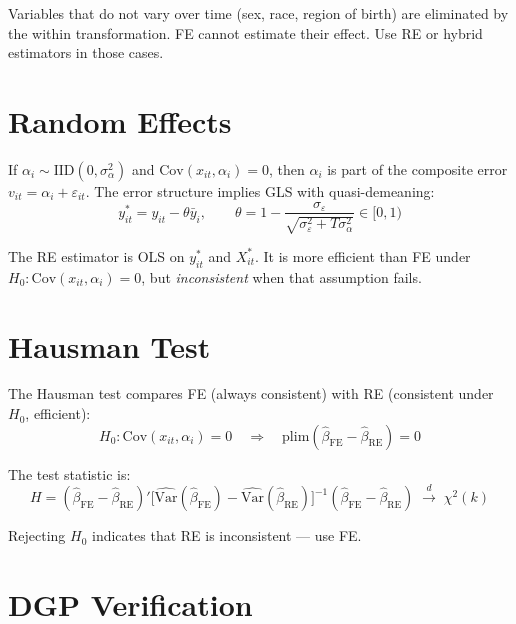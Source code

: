 \begin{aviso}
  Variables that do not vary over time (sex, race, region of birth) are
  eliminated by the within transformation. FE cannot estimate their effect.
  Use RE or hybrid estimators in those cases.
\end{aviso}

\section{Random Effects}

If $\alpha_i \sim \mathrm{IID}(0, \sigma^2_\alpha)$ and
$\mathrm{Cov}(x_{it}, \alpha_i) = 0$, then $\alpha_i$ is part of the composite error
$v_{it} = \alpha_i + \varepsilon_{it}$. The error structure implies GLS with
quasi-demeaning:
\[
  y^*_{it} = y_{it} - \theta\bar{y}_i,
  \qquad
  \theta = 1 - \frac{\sigma_\varepsilon}{\sqrt{\sigma^2_\varepsilon + T\sigma^2_\alpha}}
  \in [0,1)
\]

The RE estimator is OLS on $y^*_{it}$ and $X^*_{it}$. It is more efficient than
FE under $H_0: \mathrm{Cov}(x_{it},\alpha_i) = 0$, but \emph{inconsistent}
when that assumption fails.

\section{Hausman Test}

The Hausman test compares FE (always consistent) with RE (consistent under
$H_0$, efficient):
\[
  H_0: \mathrm{Cov}(x_{it}, \alpha_i) = 0
  \quad\Longrightarrow\quad
  \mathrm{plim}(\hat\beta_{\mathrm{FE}} - \hat\beta_{\mathrm{RE}}) = 0
\]

The test statistic is:
\[
  H = (\hat\beta_{\mathrm{FE}} - \hat\beta_{\mathrm{RE}})'
      \bigl[\widehat{\mathrm{Var}}(\hat\beta_{\mathrm{FE}}) -
             \widehat{\mathrm{Var}}(\hat\beta_{\mathrm{RE}})\bigr]^{-1}
      (\hat\beta_{\mathrm{FE}} - \hat\beta_{\mathrm{RE}})
  \;\xrightarrow{d}\; \chi^2(k)
\]

Rejecting $H_0$ indicates that RE is inconsistent --- use FE.

\section{DGP Verification}

